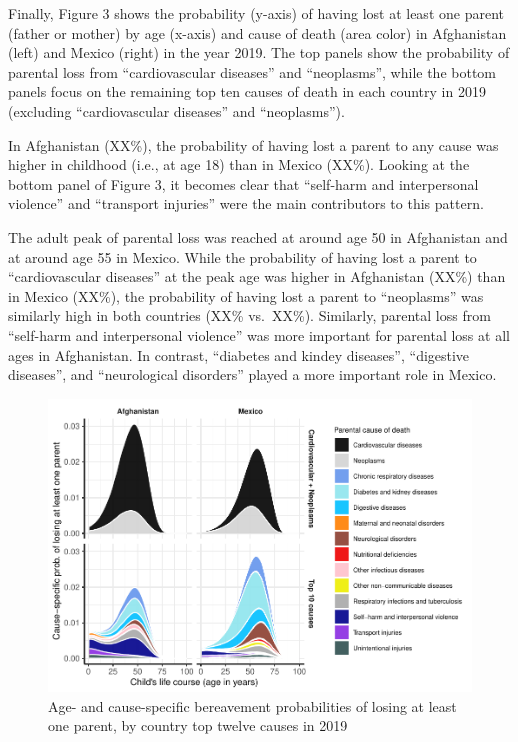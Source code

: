 \documentclass[
  11pt,
  letterpaper,
]{article}
\begin{document}
Finally, Figure 3 shows the probability (y-axis) of having lost at least one parent (father or mother) by age (x-axis) and cause of death (area color) in Afghanistan (left) and Mexico (right) in the year 2019. The top panels show the probability of parental loss from ``cardiovascular diseases'' and ``neoplasms'', while the bottom panels focus on the remaining top ten causes of death in each country in 2019 (excluding ``cardiovascular diseases'' and ``neoplasms'').

In Afghanistan (XX\%), the probability of having lost a parent to any cause was higher in childhood (i.e., at age 18) than in Mexico (XX\%). Looking at the bottom panel of Figure 3, it becomes clear that ``self-harm and interpersonal violence'' and ``transport injuries'' were the main contributors to this pattern.

The adult peak of parental loss was reached at around age 50 in Afghanistan and at around age 55 in Mexico. While the probability of having lost a parent to ``cardiovascular diseases'' at the peak age was higher in Afghanistan (XX\%) than in Mexico (XX\%), the probability of having lost a parent to ``neoplasms'' was similarly high in both countries (XX\% vs.~XX\%). Similarly, parental loss from ``self-harm and interpersonal violence'' was more important for parental loss at all ages in Afghanistan. In contrast, ``diabetes and kindey diseases'', ``digestive diseases'', and ``neurological disorders'' played a more important role in Mexico.

\begin{figure}
\centering
\includegraphics{parental_loss_global_paa_ext_abstract_files/figure-latex/ber-prob-1.pdf}
\caption{\label{fig:ber-prob}Age- and cause-specific bereavement probabilities of losing at least one parent, by country top twelve causes in 2019}
\end{figure}
\end{document}
